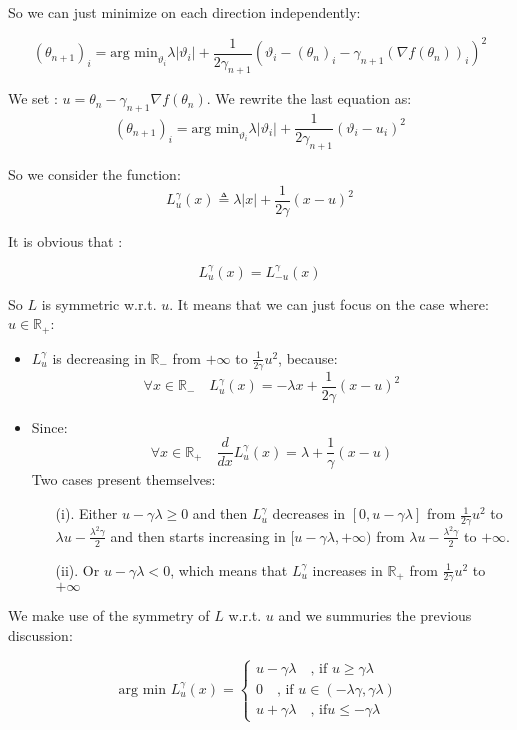 So we can just minimize on each direction independently:

$$(\theta_{n+1})_i= \text{arg min}_{\vartheta_i} \lambda \vert \vartheta_i \vert+ \frac{1}{2\gamma_{n+1}}( \vartheta_i - ( \theta_n)_i -\gamma_{n+1}( \nabla f(\theta_n))_i )^2$$

We set : $u= \theta_n-\gamma_{n+1}\nabla f(\theta_n)$. We rewrite the last equation as:
$$(\theta_{n+1})_i= \text{arg min}_{\vartheta_i} \lambda \vert \vartheta_i \vert + \frac{1}{2 \gamma_{n+1}}( \vartheta_i - u_i)^2$$

So we consider the function:
$$L^{\gamma}_u(x)\triangleq \lambda \vert x \vert+ \frac{1}{2 \gamma}( x - u)^2$$

It is obvious that :

$$L^{\gamma}_u(x) = L^{\gamma}_{-u}(x)$$

So $L$ is symmetric w.r.t. $u$. It means that we can just focus on the case where: $u \in \mathbb{R}_+$:

\begin{itemize}
	\item $L^{\gamma}_u$ is decreasing in $ \mathbb{R}_- $ from $+\infty$ to $\frac{1}{2 \gamma}u^2$, because:
	$$\forall x \in \mathbb{R}_- \quad L^{\gamma}_u(x)=-\lambda x + \frac{1}{2 \gamma}( x - u)^2$$
	\item  Since: 
	$$\forall x \in \mathbb{R}_+ \quad \frac{d}{dx}L^{\gamma}_u(x)=\lambda + \frac{1}{\gamma} (x-u)$$
	Two cases present themselves:
	\begin{itemize}
		\item [(i). ] Either $u-\gamma \lambda \geq 0 $ and then  $L^{\gamma}_u$ decreases in $ [0,u-\gamma \lambda]$ from $\frac{1}{2 \gamma}u^2$ to $\lambda u -\frac{\lambda^2 \gamma}{2} $ and then starts increasing in $[u-\gamma \lambda,+\infty)$ from $\lambda u -\frac{\lambda^2 \gamma}{2} $ to $+\infty$.
		
		\item[(ii). ] Or $u-\gamma \lambda < 0 $, which means that $L^{\gamma}_u$ increases in $\mathbb{R}_+$ from $\frac{1}{2 \gamma}u^2$ to $+\infty$
	\end{itemize}
\end{itemize}

We make use of the symmetry of $L$ w.r.t. $u$ and we summuries the previous discussion: 

$$\text{arg min }L^{\gamma}_u(x)=
\begin{cases}
u-\gamma \lambda \quad \text{, if } u\geq \gamma \lambda \\
0 \quad \text{, if } u \in (-\lambda \gamma,\gamma \lambda)\\
u+\gamma \lambda \quad \text{, if} u\leq -\gamma \lambda
\end{cases}$$

